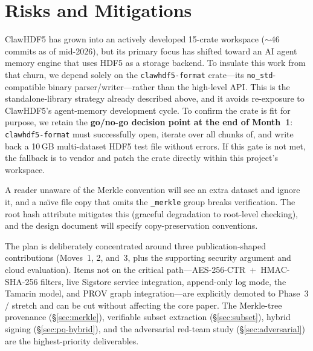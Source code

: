 \documentclass[11pt]{article}
\begin{document}
\section{Risks and Mitigations}
\label{sec:risks}

\begin{description}[nosep]
  \item[ClawHDF5 maturity.] ClawHDF5 has grown into an actively developed
    15-crate workspace ($\sim$46 commits as of mid-2026), but its primary
    focus has shifted toward an AI agent memory engine that uses HDF5 as a
    storage backend. To insulate this work from that churn, we depend solely
    on the \texttt{clawhdf5-format} crate---its \texttt{no\_std}-compatible
    binary parser/writer---rather than the high-level API. This is the
    standalone-library strategy already described above, and it avoids
    re-exposure to ClawHDF5's agent-memory development cycle. To confirm the
    crate is fit for purpose, we retain the \textbf{go/no-go decision point
    at the end of Month~1}: \texttt{clawhdf5-format} must successfully open,
    iterate over all chunks of, and write back a 10\,GB multi-dataset HDF5
    test file without errors. If this gate is not met, the fallback is to
    vendor and patch the crate directly within this project's workspace.
  \item[Companion dataset portability.] A reader unaware of the Merkle
    convention will see an extra dataset and ignore it, and a na\"{\i}ve file
    copy that omits the \texttt{\_merkle} group breaks verification. The root
    hash attribute mitigates this (graceful degradation to root-level checking),
    and the design document will specify copy-preservation conventions.
  \item[Scope concentration.] The plan is deliberately concentrated around
    three publication-shaped contributions
    (Moves~1, 2, and~3, plus the supporting security argument and cloud
    evaluation). Items not on the critical path---AES-256-CTR~$+$~HMAC-SHA-256
    filters, live Sigstore service integration, append-only log mode, the
    Tamarin model, and PROV graph integration---are explicitly demoted to
    Phase~3 / stretch and can be cut without affecting the core paper. The
    Merkle-tree provenance (\S\ref{sec:merkle}), verifiable subset extraction
    (\S\ref{sec:subset}), hybrid signing (\S\ref{sec:pq-hybrid}), and the
    adversarial red-team study (\S\ref{sec:adversarial}) are the
    highest-priority deliverables.

\end{description}
\end{document}
